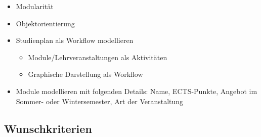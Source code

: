 \begin{itemize}[nosep]
	\item Modularität
	\item Objektorientierung
	\item Studienplan als Workflow modellieren
	\begin{itemize}[nosep]
		\item Module/Lehrveranstaltungen als Aktivitäten
		\item Graphische Darstellung als Workflow
	\end{itemize}
	\item Module modellieren mit folgenden Details: Name, ECTS-Punkte, Angebot im Sommer- oder Wintersemester, Art der Veranstaltung
\end{itemize}

\subsection{Wunschkriterien}
\label{subsec:project_goals-wunschkriterien}
